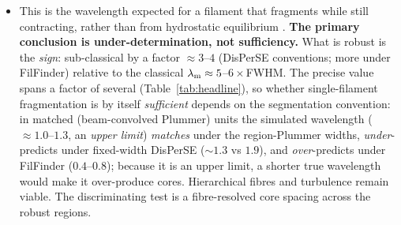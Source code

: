 \documentclass[usenatbib,twoside,twocolumn]{mnras}
\begin{document}
\begin{itemize}
\begin{itemize}
        \item This is the wavelength expected for a filament that fragments while still contracting, rather than from hydrostatic equilibrium \citep{Clarke2016}. \textbf{The primary conclusion is under-determination, not sufficiency.} What is robust is the \emph{sign}: sub-classical by a factor $\approx3$--$4$ (DisPerSE conventions; more under FilFinder) relative to the classical $\lambda_{\rm m}\approx5$--$6\times$FWHM. The precise value spans a factor of several (Table~\ref{tab:headline}), so whether single-filament fragmentation is by itself \emph{sufficient} depends on the segmentation convention: in matched (beam-convolved Plummer) units the simulated wavelength ($\approx1.0$--$1.3$, an \emph{upper limit}) \emph{matches} under the region-Plummer widths, \emph{under}-predicts under fixed-width DisPerSE ($\sim1.3$ vs $1.9$), and \emph{over}-predicts under FilFinder ($0.4$--$0.8$); because it is an upper limit, a shorter true wavelength would make it over-produce cores. Hierarchical fibres and turbulence remain viable. The discriminating test is a fibre-resolved core spacing across the robust regions.
    \end{itemize}


\end{itemize}
\end{document}
